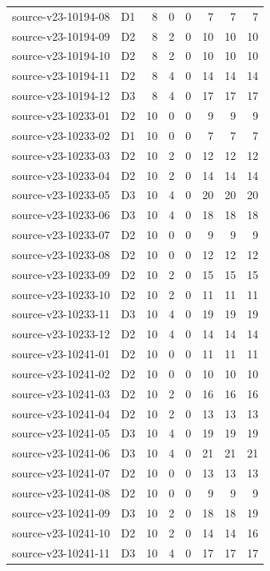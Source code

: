 \begin{longtable}{p{}lrrrrrr}
source-v23-10194-08 & D1 & 8 & 0 & 0 & 7 & 7 & 7\\
source-v23-10194-09 & D2 & 8 & 2 & 0 & 10 & 10 & 10\\
source-v23-10194-10 & D2 & 8 & 2 & 0 & 10 & 10 & 10\\
source-v23-10194-11 & D2 & 8 & 4 & 0 & 14 & 14 & 14\\
source-v23-10194-12 & D3 & 8 & 4 & 0 & 17 & 17 & 17\\
source-v23-10233-01 & D2 & 10 & 0 & 0 & 9 & 9 & 9\\
source-v23-10233-02 & D1 & 10 & 0 & 0 & 7 & 7 & 7\\
source-v23-10233-03 & D2 & 10 & 2 & 0 & 12 & 12 & 12\\
source-v23-10233-04 & D2 & 10 & 2 & 0 & 14 & 14 & 14\\
source-v23-10233-05 & D3 & 10 & 4 & 0 & 20 & 20 & 20\\
source-v23-10233-06 & D3 & 10 & 4 & 0 & 18 & 18 & 18\\
source-v23-10233-07 & D2 & 10 & 0 & 0 & 9 & 9 & 9\\
source-v23-10233-08 & D2 & 10 & 0 & 0 & 12 & 12 & 12\\
source-v23-10233-09 & D2 & 10 & 2 & 0 & 15 & 15 & 15\\
source-v23-10233-10 & D2 & 10 & 2 & 0 & 11 & 11 & 11\\
source-v23-10233-11 & D3 & 10 & 4 & 0 & 19 & 19 & 19\\
source-v23-10233-12 & D2 & 10 & 4 & 0 & 14 & 14 & 14\\
source-v23-10241-01 & D2 & 10 & 0 & 0 & 11 & 11 & 11\\
source-v23-10241-02 & D2 & 10 & 0 & 0 & 10 & 10 & 10\\
source-v23-10241-03 & D2 & 10 & 2 & 0 & 16 & 16 & 16\\
source-v23-10241-04 & D2 & 10 & 2 & 0 & 13 & 13 & 13\\
source-v23-10241-05 & D3 & 10 & 4 & 0 & 19 & 19 & 19\\
source-v23-10241-06 & D3 & 10 & 4 & 0 & 21 & 21 & 21\\
source-v23-10241-07 & D2 & 10 & 0 & 0 & 13 & 13 & 13\\
source-v23-10241-08 & D2 & 10 & 0 & 0 & 9 & 9 & 9\\
source-v23-10241-09 & D3 & 10 & 2 & 0 & 18 & 18 & 19\\
source-v23-10241-10 & D2 & 10 & 2 & 0 & 14 & 14 & 16\\
source-v23-10241-11 & D3 & 10 & 4 & 0 & 17 & 17 & 17\\

\end{longtable}
